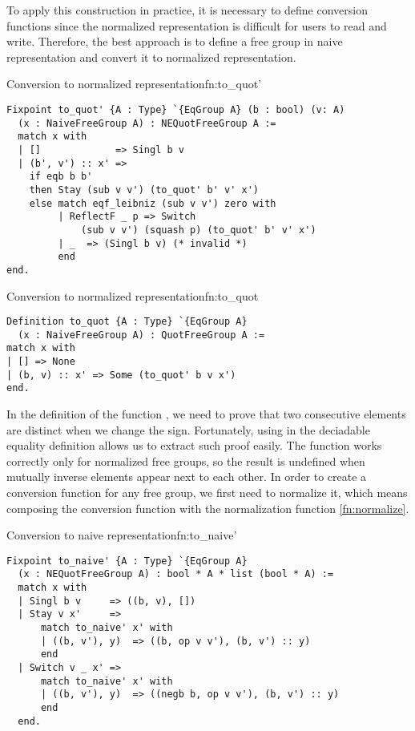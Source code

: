 To apply this construction in practice, it is necessary to define conversion functions since the normalized representation is difficult for users to read and write. Therefore, the best approach is to define a free group in naive representation and convert it to normalized representation.
\begin{func}{Conversion to normalized representation}{fn:to_quot'}
\begin{verbatim}
Fixpoint to_quot' {A : Type} `{EqGroup A} (b : bool) (v: A) 
  (x : NaiveFreeGroup A) : NEQuotFreeGroup A :=
  match x with 
  | []             => Singl b v
  | (b', v') :: x' => 
    if eqb b b' 
    then Stay (sub v v') (to_quot' b' v' x')
    else match eqf_leibniz (sub v v') zero with
         | ReflectF _ p => Switch 
             (sub v v') (squash p) (to_quot' b' v' x')
         | _  => (Singl b v) (* invalid *)
         end
end.
\end{verbatim}
\end{func}
\begin{func}{Conversion to normalized representation}{fn:to_quot}
\begin{verbatim}
Definition to_quot {A : Type} `{EqGroup A} 
  (x : NaiveFreeGroup A) : QuotFreeGroup A :=
match x with
| [] => None
| (b, v) :: x' => Some (to_quot' b v x')
end.
\end{verbatim}
\end{func}
In the definition of the function , we need to prove that two consecutive elements are distinct when we change the sign. Fortunately, using  in the deciadable equality definition allows us to extract such proof easily. The  function works correctly only for normalized free groups, so the result is undefined when mutually inverse elements appear next to each other. In order to create a conversion function for any free group, we first need to normalize it, which means composing the conversion function with the normalization function \ref{fn:normalize}.
\begin{func}{Conversion to naive representation}{fn:to_naive'}
\begin{verbatim}
Fixpoint to_naive' {A : Type} `{EqGroup A} 
  (x : NEQuotFreeGroup A) : bool * A * list (bool * A) :=
  match x with 
  | Singl b v     => ((b, v), [])
  | Stay v x'     => 
      match to_naive' x' with
      | ((b, v'), y)  => ((b, op v v'), (b, v') :: y)
      end
  | Switch v _ x' => 
      match to_naive' x' with
      | ((b, v'), y)  => ((negb b, op v v'), (b, v') :: y)
      end
  end.
\end{verbatim}
\end{func}

